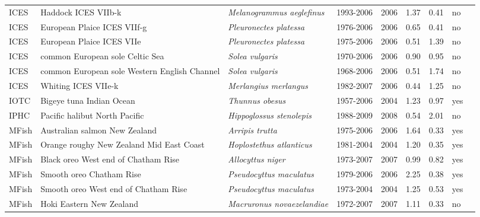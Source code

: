 \begin{longtable}{p{1.8cm}p{4cm}p{4cm}ccccp{1.9cm}c}
  ICES & Haddock ICES VIIb-k & \textit{Melanogrammus aeglefinus} & 1993-2006 & 2006 & 1.37 & 0.41 & no & \cite{WGSSDS-HADVIIb-k-1993-2006-JENNINGS} \\ 
  ICES & European Plaice ICES VIIf-g & \textit{Pleuronectes platessa} & 1976-2006 & 2006 & 0.65 & 0.41 & no & \cite{WGSSDS-PLAICCELT-1976-2006-JENNINGS} \\ 
  ICES & European Plaice ICES VIIe & \textit{Pleuronectes platessa} & 1975-2006 & 2006 & 0.51 & 1.39 & no & \cite{WGSSDS-PLAICECHW-1975-2006-JENNINGS} \\ 
  ICES & common European sole Celtic Sea & \textit{Solea vulgaris} & 1970-2006 & 2006 & 0.90 & 0.95 & no & \cite{WGSSDS-SOLECS-1970-2006-JENNINGS} \\ 
  ICES & common European sole Western English Channel & \textit{Solea vulgaris} & 1968-2006 & 2006 & 0.51 & 1.74 & no & \cite{WGSSDS-SOLEVIIe-1968-2006-JENNINGS} \\ 
  ICES & Whiting ICES VIIe-k & \textit{Merlangius merlangus} & 1982-2007 & 2006 & 0.44 & 1.25 & no & \cite{WGSSDS-WHITVIIek-1982-2007-JENNINGS} \\ 
  IOTC & Bigeye tuna Indian Ocean & \textit{Thunnus obesus} & 1957-2006 & 2004 & 1.23 & 0.97 & yes & \cite{IOTC-BIGEYEIO-1957-2006-JENSEN} \\ 
  IPHC & Pacific halibut North Pacific & \textit{Hippoglossus stenolepis} & 1988-2009 & 2008 & 0.54 & 2.01 & no & \cite{IPHC-PHALNPAC-1988-2009-Parma} \\ 
  MFish & Australian salmon New Zealand & \textit{Arripis trutta} & 1975-2006 & 2006 & 1.64 & 0.33 & yes & \cite{NIWA-AUSSALMONNZ-1975-2006-JENSEN} \\ 
  MFish & Orange roughy New Zealand Mid East Coast & \textit{Hoplostethus atlanticus} & 1981-2004 & 2004 & 1.20 & 0.35 & yes & \cite{NIWA-OROUGHYNZMEC-1981-2004-JENSEN} \\ 
  MFish & Black oreo West end of Chatham Rise & \textit{Allocyttus niger} & 1973-2007 & 2007 & 0.99 & 0.82 & yes & \cite{NZMFishDEEPWATER-BLACKOREOWECR-1973-2007-JENSEN} \\ 
  MFish & Smooth oreo Chatham Rise & \textit{Pseudocyttus maculatus} & 1979-2006 & 2006 & 2.25 & 0.38 & yes & \cite{NZMFishDEEPWATER-SMOOTHOREOCR-1979-2006-JENSEN} \\ 
  MFish & Smooth oreo West end of Chatham Rise & \textit{Pseudocyttus maculatus} & 1973-2004 & 2004 & 1.25 & 0.53 & yes & \cite{NZMFishDEEPWATER-SMOOTHOREOWECR-1973-2004-JENSEN} \\ 
  MFish & Hoki Eastern New Zealand & \textit{Macruronus novaezelandiae} & 1972-2007 & 2007 & 1.11 & 0.33 & no & \cite{NZMFishHOKIWG-HOKIENZ-1972-2007-FRANCIS} \\ 

\end{longtable}
